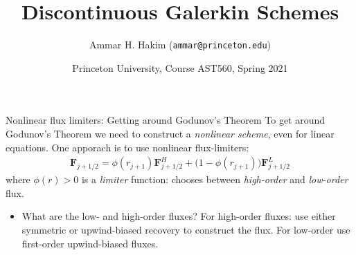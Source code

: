 \documentclass[aspectratio=169]{beamer}
\title[{\tt }]{Discontinuous Galerkin Schemes}%
\author[https://ast560.rtfd.io]%
{Ammar H. Hakim ({\tt ammar@princeton.edu}) \inst{1}}%
\institute[PPPL]
{ \inst{1} Princeton Plasma Physics Laboratory, Princeton, NJ %
}
\date[3/30/2021]{Princeton University, Course AST560, Spring 2021}
\newcommand{\mvec}[1]{\mathbf{#1}}
\begin{document}
\begin{frame}[plain]
  \titlepage
\end{frame}

\begin{frame}{Nonlinear flux limiters: Getting around Godunov's Theorem}
  To get around Godunov's Theorem we need to construct a
  \emph{nonlinear scheme}, even for linear equations. One apporach is
  to use nonlinear flux-limiters:
  \begin{align*}
    \mvec{F}_{j+1/2} = \phi(r_{j+1}) \mvec{F}^H_{j+1/2} + \big(1-\phi(r_{j+1})\big) \mvec{F}^L_{j+1/2}
  \end{align*}
  where $\phi(r)>0$ is a \emph{limiter} function: chooses between
  \emph{high-order} and \emph{low-order} flux.
  \begin{itemize} 
  \item What are the low- and high-order fluxes? For high-order
    fluxes: use either symmetric or upwind-biased recovery to
    construct the flux. For low-order use first-order upwind-biased
    fluxes.
  \end{itemize}
\end{frame}
\end{document}
